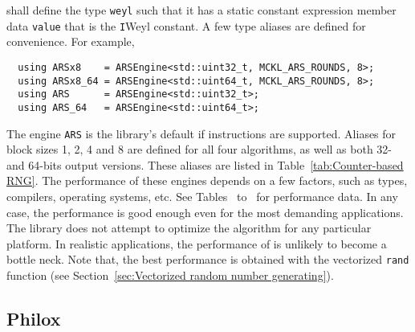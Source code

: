 shall define the type \verb|weyl| such that it has a static constant expression
member data \verb|value| that is the \verb|I|\ith Weyl constant. A few type
aliases are defined for convenience. For example,
\begin{Verbatim}
  using ARSx8    = ARSEngine<std::uint32_t, MCKL_ARS_ROUNDS, 8>;
  using ARSx8_64 = ARSEngine<std::uint64_t, MCKL_ARS_ROUNDS, 8>;
  using ARS      = ARSEngine<std::uint32_t>;
  using ARS_64   = ARSEngine<std::uint64_t>;
\end{Verbatim}
The engine \verb|ARS| is the library's default \rng if \aesni instructions are
supported. Aliases for block sizes 1, 2, 4 and 8 are defined for all four
algorithms, as well as both 32- and 64-bits output versions. These aliases are
listed in Table~\ref{tab:Counter-based RNG}. The performance of these engines
depends on a few factors, such as \cpu types, compilers, operating systems,
etc. See Tables~
to~ for performance data. In any case, the
performance is good enough even for the most demanding applications. The
library does not attempt to optimize the algorithm for any particular platform.
In realistic applications, the performance of \rng is unlikely to become a
bottle neck. Note that, the best performance is obtained with the vectorized
\verb|rand| function (see Section~\ref{sec:Vectorized random number
  generating}).

\subsection{Philox}
\label{sub:Philox}


